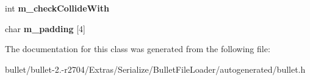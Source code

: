 \begin{DoxyCompactItemize}
\item 
\hypertarget{class_bullet_1_1bt_collision_object_double_data_a37860c3a810e61095011029fe70b603b}{int {\bfseries m\+\_\+check\+Collide\+With}}\label{class_bullet_1_1bt_collision_object_double_data_a37860c3a810e61095011029fe70b603b}

\item 
\hypertarget{class_bullet_1_1bt_collision_object_double_data_ad6681967da519ccd4033fcb14280939c}{char {\bfseries m\+\_\+padding} \mbox{[}4\mbox{]}}\label{class_bullet_1_1bt_collision_object_double_data_ad6681967da519ccd4033fcb14280939c}

\end{DoxyCompactItemize}


The documentation for this class was generated from the following file\+:\begin{DoxyCompactItemize}
\item 
bullet/bullet-\/2.-\/r2704/\+Extras/\+Serialize/\+Bullet\+File\+Loader/autogenerated/bullet.\+h\end{DoxyCompactItemize}
